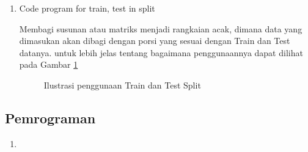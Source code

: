 \begin{enumerate}
\item Code program for train, test in split
\par Membagi susunan atau matriks menjadi rangkaian acak, dimana data yang dimasukan akan dibagi dengan porsi yang sesuai dengan Train dan Test datanya. untuk lebih jelas tentang bagaimana penggunaannya dapat dilihat pada Gambar \ref{data3}

\begin{figure}[!htbp]
      \caption{Ilustrasi  penggunaan Train dan Test Split}
      \label{data3}
\end{figure}

\end{enumerate}

\subsection{Pemrograman}
\begin{enumerate}
\item 
\end{enumerate}
